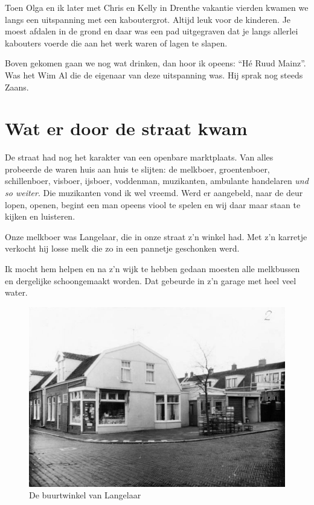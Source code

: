 \documentclass[12pt,twoside, openright]{memoir}
\begin{document}
Toen Olga en ik later met Chris en Kelly in Drenthe vakantie vierden kwamen we langs een uitspanning met een kaboutergrot. Altijd leuk voor de kinderen. Je moest afdalen in de grond en daar was een pad uitgegraven dat je langs allerlei kabouters voerde die aan het werk waren of lagen te slapen. 

Boven gekomen gaan we nog wat drinken, dan hoor ik opeens: ``Hé Ruud Mainz''. Was het Wim Al die de eigenaar van deze uitspanning was. Hij sprak nog steeds Zaans.

\section*{Wat er door de straat kwam} %
\label{cha:straat}

De straat had nog het karakter van een openbare marktplaats. Van alles probeerde de waren huis aan huis te slijten: de melkboer, groentenboer, schillenboer, visboer, ijsboer, voddenman, muzikanten, ambulante handelaren \emph{und so weiter}. Die muzikanten vond ik wel vreemd. Werd er aangebeld, naar de deur lopen, openen, begint een man opeens viool te spelen en wij daar maar staan te kijken en luisteren.

Onze melkboer was Langelaar, die in onze straat z’n winkel had. Met z’n karretje verkocht hij losse melk die zo in een pannetje  geschonken werd. 

Ik mocht hem helpen en na z’n wijk te hebben gedaan moesten alle melkbussen en dergelijke schoongemaakt worden. Dat gebeurde in z’n garage met heel veel water.

\begin{figure}
\centering
\includegraphics[width=\textwidth]{img/64Rosmolenstraat-Langelaar-1966}
\caption*{\footnotesize De buurtwinkel van Langelaar}
\end{figure}
\end{document}
